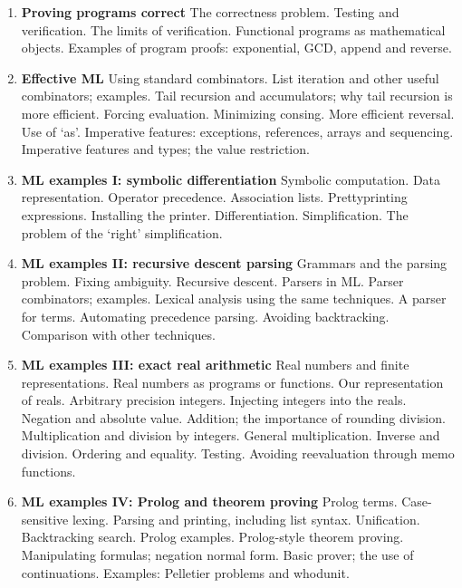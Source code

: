 \begin{enumerate}
\item {\bf Proving programs correct} The correctness problem. Testing and
verification. The limits of verification. Functional programs as mathematical
objects. Examples of program proofs: exponential, GCD, append and reverse.

\item {\bf Effective ML} Using standard combinators. List iteration and other
useful combinators; examples. Tail recursion and accumulators; why tail
recursion is more efficient. Forcing evaluation. Minimizing consing. More
efficient reversal. Use of `as'. Imperative features: exceptions, references,
arrays and sequencing. Imperative features and types; the value restriction.

\item {\bf ML examples I: symbolic differentiation} Symbolic computation. Data
representation. Operator precedence. Association lists. Prettyprinting
expressions. Installing the printer. Differentiation. Simplification. The
problem of the `right' simplification.

\item {\bf ML examples II: recursive descent parsing} Grammars and the parsing
problem. Fixing ambiguity. Recursive descent. Parsers in ML. Parser
combinators; examples. Lexical analysis using the same techniques. A parser for
terms. Automating precedence parsing. Avoiding backtracking. Comparison with
other techniques.

\item {\bf ML examples III: exact real arithmetic} Real numbers and finite
representations. Real numbers as programs or functions. Our representation of
reals. Arbitrary precision integers. Injecting integers into the reals.
Negation and absolute value. Addition; the importance of rounding division.
Multiplication and division by integers. General multiplication. Inverse and
division. Ordering and equality. Testing. Avoiding reevaluation through memo
functions.

\item {\bf ML examples IV: Prolog and theorem proving} Prolog terms.
Case-sensitive lexing. Parsing and printing, including list syntax.
Unification. Backtracking search. Prolog examples. Prolog-style theorem
proving. Manipulating formulas; negation normal form. Basic prover; the use of
continuations. Examples: Pelletier problems and whodunit.

\end{enumerate}

